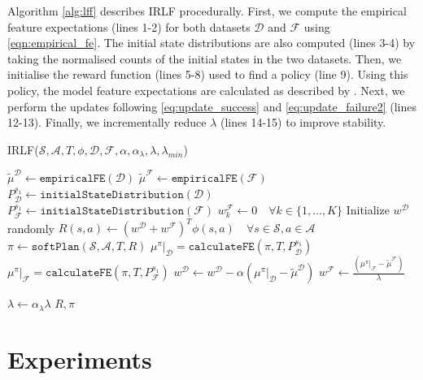 \documentclass{aamas2016}
\begin{document}
Algorithm \ref{alg:lff} describes IRLF procedurally. First, we compute the empirical feature expectations (lines 1-2) for both datasets $\mathcal{D}$ and $\mathcal{F}$ using \eqref{eqn:empirical_fe}.	The initial state distributions are also computed (lines 3-4) by taking the normalised counts of the initial states in the two datasets. Then, we initialise the reward function (lines 5-8) used to find a policy (line 9). Using this policy, the model feature expectations are calculated as described by \cite{ziebart2013principle}. Next, we perform the updates following \eqref{eq:update_success} and \eqref{eq:update_failure2} (lines 12-13). Finally, we incrementally reduce $\lambda$ (lines 14-15) to improve stability.

\begin{algorithm}
\caption{IRLF($\mathcal{S},\mathcal{A},T, \phi, \mathcal{D}, \mathcal{F}, \alpha, \alpha_{\lambda}, \lambda, \lambda_{min}$) }
\label{alg:lff}
\begin{algorithmic}[1]
\STATE $\widetilde{\mu}^{\mathcal{D}} \gets \mathtt{empiricalFE}(\mathcal{D})$\hfill {}
\STATE $\widetilde{\mu}^{\mathcal{F}} \gets \mathtt{empiricalFE}(\mathcal{F})$ 
\STATE $P_{\mathcal{D}}^{s_1} \gets \mathtt{initialStateDistribution}(\mathcal{D})$
\STATE $P_{\mathcal{F}}^{s_1} \gets \mathtt{initialStateDistribution}(\mathcal{F})$
\STATE $w^{\mathcal{F}}_k\gets 0\quad\forall k\in\{1,\ldots,K\}$
\STATE Initialize $w^{\mathcal{D}}$ randomly
\REPEAT
\STATE $R(s,a) \gets (w^{\mathcal{D}}+w^{\mathcal{F}})^T\phi(s,a)\quad\forall s\in\mathcal{S},a\in\mathcal{A}$
\STATE $\pi \gets \mathtt{softPlan}(\mathcal{S},\mathcal{A},T,R)$\hfill{}
\STATE $\mu^\pi|_{\mathcal{D}} = \mathtt{calculateFE}(\pi,T,P_{\mathcal{D}}^{s_1})$
\STATE $\mu^\pi|_{\mathcal{F}} = \mathtt{calculateFE}(\pi,T,P_{\mathcal{F}}^{s_1})$
\STATE $w^{\mathcal{D}} \leftarrow w^{\mathcal{D}} - \alpha (\mu^\pi|_{\mathcal{D}} - \widetilde{\mu}^{\mathcal{D}})$
\STATE $w^{\mathcal{F}} \leftarrow \frac{(\mu^\pi|_{\mathcal{F}} - \widetilde{\mu}^{\mathcal{F}})}{\lambda}$

\STATE $\lambda \leftarrow \alpha_{\lambda}\lambda$
\ENDIF
{}
\RETURN $R,\pi$
\end{algorithmic}
\end{algorithm}


\section{Experiments}
\end{document}
